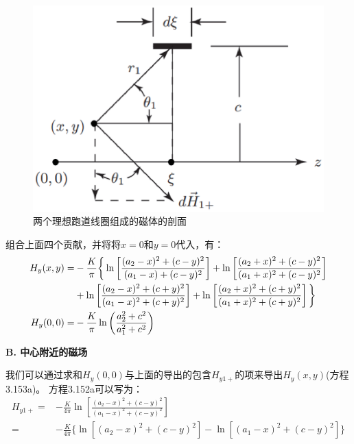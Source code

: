 \begin{figure}[htbp]
	\centering
	\includegraphics[scale=0.5]{chpt3/figs/fig3.37.eps}
	\caption{两个理想跑道线圈组成的磁体的剖面
	}
\end{figure}

组合上面四个贡献，并将将$x=0$和$y=0$代入，有：
\begin{subequations}
	\begin{align}
H_{y}(x,y)=&-\frac{K}{\pi}\bigg\{\ln\left[\frac{(a_{2}-x)^{2}+(c-y)^{2}}{(a_{1}-x)+(c-y)^{2}}\right]+\ln\left[\frac{(a_{2}+x)^{2}+(c-y)^{2}}{(a_{1}+x)^{2}+(c-y)^{2}}\right]\notag\\
&+\ln\left[\frac{(a_{2}-x)^{2}+(c+y)^{2}}{(a_{1}-x)^{2}+(c+y)^{2}}\right]+\ln\left[\frac{(a_{2}+x)^{2}+(c+y)^{2}}{(a_{1}+x)^{2}+(c+y)^{2}}\right]\bigg\}\\
H_{y}(0,0)=&-\frac{K}{\pi}\ln\left(\frac{a_{2}^{2}+c^{2}}{a_{1}^{2}+c^{2}}\right)%
\end{align}
\end{subequations}

\textbf{B. 中心附近的磁场}

我们可以通过求和$H_y(0,0)$与上面的导出的包含$H_{y1+}$的项来导出$H_y(x,y)$(方程3.153a)。
方程3.152a可以写为：
\begin{equation}
\begin{split}
H_{y1+}=&-\frac{K}{4\pi}\ln[\frac{(a_{2}-x)^{2}+(c-y)^{2}}{(a_{1}-x)^{2}+(c-y)^{2}}]\\
=&-\frac{K}{4\pi}\{\ln[(a_{2}-x)^{2}+(c-y)^{2}]-\ln[(a_{1}-x)^{2}+(c-y)^{2}]\}%
\end{split}
\end{equation}

